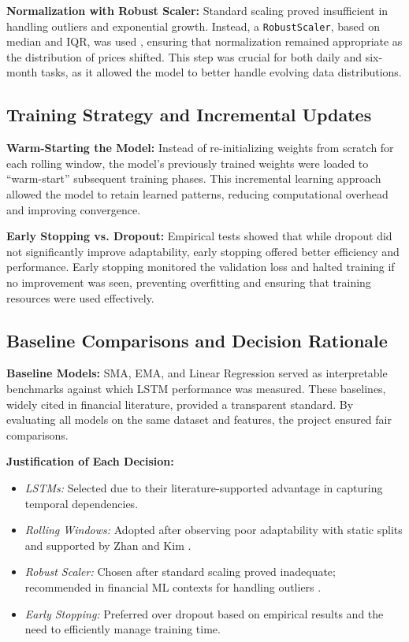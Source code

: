 \documentclass[10pt,twocolumn]{article}
\begin{document}
\textbf{Normalization with Robust Scaler:}  
Standard scaling proved insufficient in handling outliers and exponential growth. Instead, a \texttt{RobustScaler}, based on median and IQR, was used \cite{Passalis2021RobustNormalization}, ensuring that normalization remained appropriate as the distribution of prices shifted. This step was crucial for both daily and six-month tasks, as it allowed the model to better handle evolving data distributions.

\subsection{Training Strategy and Incremental Updates}

\textbf{Warm-Starting the Model:}  
Instead of re-initializing weights from scratch for each rolling window, the model’s previously trained weights were loaded to “warm-start” subsequent training phases. This incremental learning approach allowed the model to retain learned patterns, reducing computational overhead and improving convergence.

\textbf{Early Stopping vs. Dropout:}  
Empirical tests showed that while dropout did not significantly improve adaptability, early stopping offered better efficiency and performance. Early stopping monitored the validation loss and halted training if no improvement was seen, preventing overfitting and ensuring that training resources were used effectively.

\subsection{Baseline Comparisons and Decision Rationale}

\textbf{Baseline Models:}  
SMA, EMA, and Linear Regression served as interpretable benchmarks against which LSTM performance was measured. These baselines, widely cited in financial literature, provided a transparent standard. By evaluating all models on the same dataset and features, the project ensured fair comparisons.

\textbf{Justification of Each Decision:}  
\begin{itemize}
    \item \textit{LSTMs:} Selected due to their literature-supported advantage in capturing temporal dependencies.
    \item \textit{Rolling Windows:} Adopted after observing poor adaptability with static splits and supported by Zhan and Kim \cite{Zhan2024SlidingWindow}.
    \item \textit{Robust Scaler:} Chosen after standard scaling proved inadequate; recommended in financial ML contexts for handling outliers \cite{Passalis2021RobustNormalization}.
    \item \textit{Early Stopping:} Preferred over dropout based on empirical results and the need to efficiently manage training time.
\end{itemize}
\end{document}
